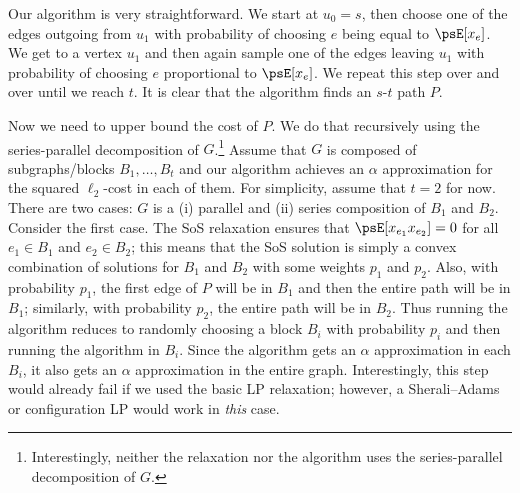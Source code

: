 \documentclass[11pt,a4paper]{article}
\begin{document}
Our algorithm is very straightforward. We start at $u_0=s$, then choose one of the edges outgoing from $u_1$ with probability of choosing $e$ being equal to $\psE[x_e]$. We get to a vertex $u_1$ and then again sample one of the edges leaving $u_1$ with probability of choosing $e$ proportional to $\psE[x_e]$. We repeat this step over and over until we reach $t$. It is clear that the algorithm finds an $s$-$t$ path $P$. 

Now we need to upper bound the cost of $P$. We do that recursively using the series-parallel decomposition of $G$.\footnote{Interestingly, neither the relaxation nor the algorithm uses the series-parallel decomposition of $G$.} Assume that $G$ is composed of subgraphs/blocks $B_1,\dots,B_t$ 
and our algorithm achieves an $\alpha$ approximation for the squared $\ell_2$-cost in each of them. For simplicity, assume that $t=2$ for now. There are two cases: $G$ is a (i) parallel and (ii) series composition of $B_1$ and $B_2$. Consider the first case.
The SoS relaxation ensures that $\psE[x_{e_1}x_{e_2}] = 0$ for all $e_1\in B_1$ and $e_2\in B_2$; this means that the SoS solution is simply a convex combination of solutions for $B_1$ and $B_2$ with some weights $p_1$ and $p_2$.
Also, with probability $p_1$, the first edge of $P$ will be in $B_1$ and then the entire path will be in $B_1$; similarly, with probability $p_2$, the entire path will be in $B_2$. Thus running the algorithm reduces to randomly choosing a block $B_i$ with probability $p_i$ and then running the algorithm in $B_i$. Since the algorithm gets an $\alpha$ approximation in each $B_i$, it also gets an $\alpha$ approximation in the entire graph. Interestingly, this step would already fail if we used the basic LP relaxation; however, a Sherali--Adams or configuration LP would work in \textit{this} case.
\end{document}
